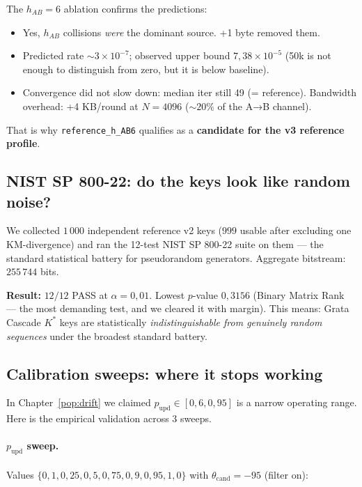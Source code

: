 \documentclass[11pt,a4paper]{article}
\begin{document}
\begin{aha}
The $h_{AB}=6$ ablation confirms the predictions:
\begin{itemize}[leftmargin=*]
\item Yes, $h_{AB}$ collisions \emph{were} the dominant source. +1 byte removed them.
\item Predicted rate $\sim 3 \times 10^{-7}$; observed upper bound $7{,}38 \times 10^{-5}$ (50k is not enough to distinguish from zero, but it is below baseline).
\item Convergence did not slow down: median iter still 49 (= reference). Bandwidth overhead: +4 KB/round at $N=4096$ ($\sim 20\%$ of the A→B channel).
\end{itemize}

That is why \texttt{reference\_h\_AB6} qualifies as a \textbf{candidate for the v3 reference profile}.
\end{aha}

\subsection{NIST SP 800-22: do the keys look like random noise?}\label{pop:exp-nist}

We collected $1\,000$ independent reference v2 keys ($999$ usable after excluding one KM-divergence) and ran the 12-test NIST SP 800-22 suite on them --- the standard statistical battery for pseudorandom generators. Aggregate bitstream: $255\,744$ bits.

\textbf{Result:} $12/12$ PASS at $\alpha = 0{,}01$. Lowest $p$-value $0{,}3156$ (Binary Matrix Rank --- the most demanding test, and we cleared it with margin). This means: Grata Cascade $K^*$ keys are statistically \emph{indistinguishable from genuinely random sequences} under the broadest standard battery.

\subsection{Calibration sweeps: where it stops working}\label{pop:exp-sweeps}

In Chapter~\ref{pop:drift} we claimed $p_\text{upd} \in [0{,}6, 0{,}95]$ is a narrow operating range. Here is the empirical validation across 3 sweeps.

\paragraph{$p_\text{upd}$ sweep.}
Values $\{0{,}1, 0{,}25, 0{,}5, 0{,}75, 0{,}9, 0{,}95, 1{,}0\}$ with $\theta_\text{cand} = -95$ (filter on):
\end{document}
